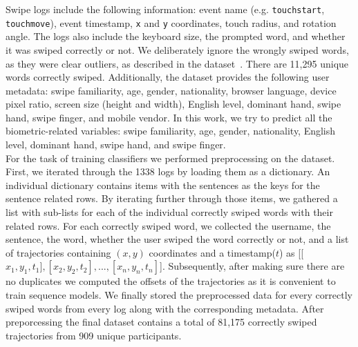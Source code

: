 \documentclass[11pt,oneside,a4paper,openright]{book}
\begin{document}
Swipe logs include the following information:
event name (e.g. \texttt{touchstart}, \texttt{touchmove}),
event timestamp,
\texttt{x} and \texttt{y} coordinates,
touch radius,
and rotation angle.
The logs also include the keyboard size, the prompted word, and whether it was swiped correctly or not.
We deliberately ignore the wrongly swiped words,
as they were clear outliers, as described in the dataset~\cite{Leiva21_swipe}.
There are 11,295 unique words correctly swiped. Additionally, the dataset provides the following user metadata:
swipe familiarity, age, gender, nationality, browser language,
device pixel ratio, screen size (height and width), English level,
dominant hand, swipe hand, swipe finger, and mobile vendor.
In this work, we try to predict all the biometric-related variables:
swipe familiarity, age, gender, nationality, English level, dominant hand, swipe hand, and swipe finger.\\

For the task of training classifiers we performed preprocessing on the dataset. First, we iterated through the 1338 logs by loading them as a dictionary. An individual dictionary contains items with the sentences as the keys for the sentence related rows. By iterating further through those items, we gathered a list with sub-lists for each of the individual correctly swiped words with their related rows. For each correctly swiped word, we collected the username, the sentence, the word, whether the user swiped the word correctly or not, and a list of trajectories containing $(x,y)$ coordinates and a timestamp($t$) as [[$x_{1}, y_{1}, t_{1}], [x_{2}, y_{2}, t_{2}],. . . , [x_{n}, y_{n}, t_{n}]$]. Subsequently, after making sure there are no duplicates we computed the offsets of the trajectories as it is convenient to train sequence models. We finally stored the preprocessed data for every correctly swiped words from every log along with the corresponding metadata. After preporcessing the final dataset contains a total of 81,175 correctly swiped trajectories from 909 unique participants.\\


\end{document}
